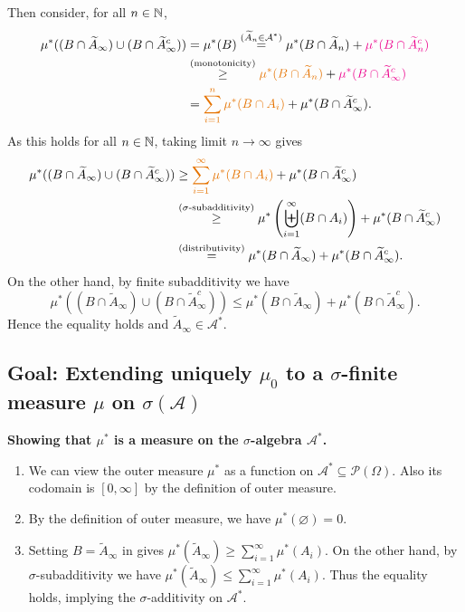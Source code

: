 \begin{enumerate}
\begin{pf}
\begin{itemize}
\begin{enumerate}[label={(\arabic*)}]
Then consider, for all \(n\in\mathbb{N}\),
\begin{align*}
\mu^*((B\cap\widetilde{A}_{\infty})\cup(B\cap\widetilde{A}_{\infty}^{c}))
&=\mu^*(B)
\overset{(\widetilde{A}_{n}\in\mathcal{A}^*)}{=}
\mu^*(B\cap\widetilde{A}_n)+\mgc{\mu^*(B\cap\widetilde{A}_n^{c})} \\
&\overset{\text{(monotonicity)}}{\ge}
\orc{\mu^*(B\cap\widetilde{A}_n)}+\mgc{\mu^*(B\cap\widetilde{A}_{\infty}^{c})} \\
&=\orc{\sum_{i=1}^{n}\mu^*(B\cap A_i)}+\mu^*(B\cap\widetilde{A}_{\infty}^{c}).
\end{align*}
As this holds for all \(n\in\mathbb{N}\), taking limit \(n\to\infty\) gives
\begin{align}
\label{eq:mu-star-geq-sum}\mu^*((B\cap\widetilde{A}_{\infty})\cup(B\cap\widetilde{A}_{\infty}^{c}))
&\ge\orc{\sum_{i=1}^{\infty}\mu^*(B\cap A_i)}+\mu^*(B\cap\widetilde{A}_{\infty}^{c}) \\
\nonumber&\overset{\text{(\(\sigma\)-subadditivity)}}{\ge}
\mu^*\left(\biguplus_{i=1}^{\infty}(B\cap A_i)\right)+\mu^*(B\cap\widetilde{A}_{\infty}^{c}) \\
\nonumber&\overset{\text{(distributivity)}}{=}\mu^*(B\cap\widetilde{A}_{\infty})+\mu^*(B\cap\widetilde{A}_{\infty}^{c}).
\end{align}
On the other hand, by finite subadditivity we have
\[
\mu^*((B\cap\widetilde{A}_{\infty})\cup(B\cap\widetilde{A}_{\infty}^{c}))
\le\mu^*(B\cap\widetilde{A}_{\infty})+\mu^*(B\cap\widetilde{A}_{\infty}^{c}).
\]
Hence the equality holds and \(\widetilde{A}_{\infty}\in\mathcal{A}^*\).
\end{enumerate}
\end{itemize}
\subsection*{Goal: Extending uniquely \(\mu_0\) to a \(\sigma\)-finite measure \(\mu\)
on \(\sigma(\mathcal{A})\)}
\textbf{Showing that \(\mu^*\) is a measure on the \(\sigma\)-algebra \(\mathcal{A}^*\).}
\begin{enumerate}[label={(\arabic*)}]
\item We can view the outer measure \(\mu^*\) as a function on
\(\mathcal{A}^*\subseteq \mathcal{P}(\Omega)\). Also its codomain is
\([0,\infty]\) by the definition of outer measure.
\item By the definition of outer measure, we have \(\mu^*(\varnothing)=0\).
\item Setting \(B=\widetilde{A}_{\infty}\) in  gives
\(\mu^*(\widetilde{A}_{\infty})\ge\sum_{i=1}^{\infty}\mu^*(A_i)\). On the other
hand, by \(\sigma\)-subadditivity we have
\(\mu^*(\widetilde{A}_{\infty})\le\sum_{i=1}^{\infty}\mu^*(A_i)\). Thus the
equality holds, implying the \(\sigma\)-additivity on \(\mathcal{A}^*\).
\end{enumerate}


\end{pf}
\end{enumerate}
